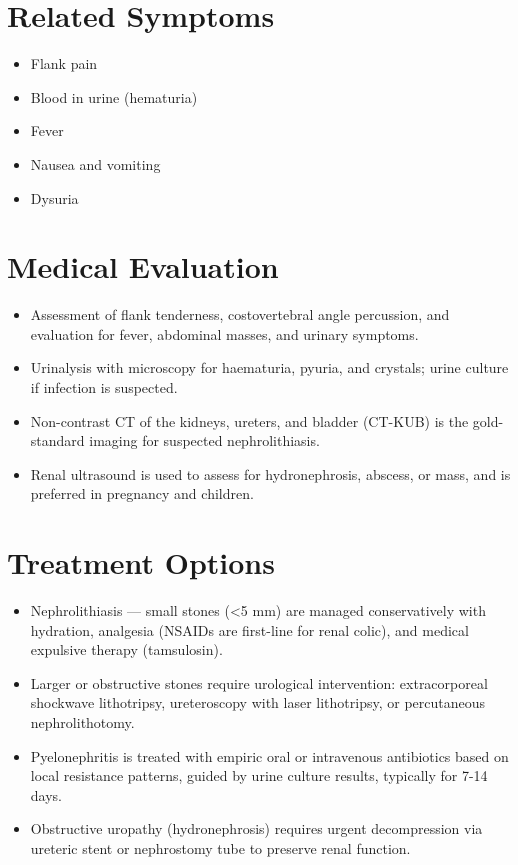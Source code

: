 \section*{Related Symptoms}
\begin{itemize}
  \item Flank pain
  \item Blood in urine (hematuria)
  \item Fever
  \item Nausea and vomiting
  \item Dysuria
\end{itemize}

\section*{Medical Evaluation}
\begin{itemize}
  \item Assessment of flank tenderness, costovertebral angle percussion, and evaluation for fever, abdominal masses, and urinary symptoms.
  \item Urinalysis with microscopy for haematuria, pyuria, and crystals; urine culture if infection is suspected.
  \item Non-contrast CT of the kidneys, ureters, and bladder (CT-KUB) is the gold-standard imaging for suspected nephrolithiasis.
  \item Renal ultrasound is used to assess for hydronephrosis, abscess, or mass, and is preferred in pregnancy and children.
\end{itemize}

\section*{Treatment Options}
\begin{itemize}
  \item Nephrolithiasis — small stones (<5 mm) are managed conservatively with hydration, analgesia (NSAIDs are first-line for renal colic), and medical expulsive therapy (tamsulosin).
  \item Larger or obstructive stones require urological intervention: extracorporeal shockwave lithotripsy, ureteroscopy with laser lithotripsy, or percutaneous nephrolithotomy.
  \item Pyelonephritis is treated with empiric oral or intravenous antibiotics based on local resistance patterns, guided by urine culture results, typically for 7-14 days.
  \item Obstructive uropathy (hydronephrosis) requires urgent decompression via ureteric stent or nephrostomy tube to preserve renal function.
\end{itemize}

